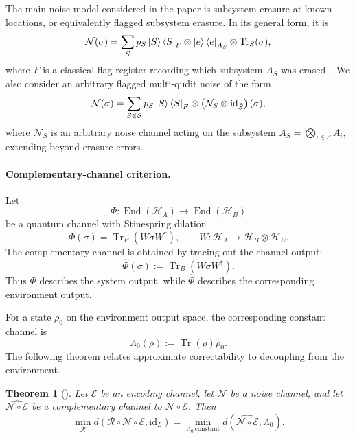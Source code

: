 \documentclass[10pt,twocolumn,superscriptaddress,aps,amsmath,amssymb,citeautoscript,floatfix,prx]{revtex4-2}
\newtheorem{theorem}{Theorem}
\theoremstyle{plain}
\theoremstyle{plain}
\theoremstyle{plain}
\theoremstyle{plain}
\theoremstyle{plain}
\theoremstyle{plain}
\theoremstyle{plain}
\theoremstyle{definition}
\theoremstyle{plain}
\begin{document}
The main noise model considered in the paper is subsystem erasure at known locations, or equivalently flagged subsystem erasure. In its general form, it is
\begin{equation}\label{eq:erasure_noise}
\mathcal N(\sigma)
=
\sum_S
p_S
\ket S\bra S_F
\otimes
\ket e\bra e_{A_S}
\otimes
\operatorname{Tr}_S(\sigma),
\end{equation}
where $F$ is a classical flag register recording which subsystem $A_S$ was erased~\cite{Faist2020}. 
We also consider an arbitrary flagged multi-qudit noise of the form
\begin{equation}\label{eq:arbitrary_multiqudit_noise}
\mathcal N(\sigma)
=
\sum_{S\in\mathcal S}
p_S
\ket S\bra S_F
\otimes
\left(
\mathcal N_S
\otimes
\mathrm{id}_{\hat S}
\right)(\sigma),
\end{equation}
where $\mathcal N_S$ is an arbitrary noise channel acting on the subsystem $A_S=\bigotimes_{i\in S}A_i$, extending beyond erasure errors.

\paragraph{Complementary-channel criterion.}

Let
$$
\Phi:\operatorname{End}(\mathcal H_A)\to\operatorname{End}(\mathcal H_B)
$$
be a quantum channel with Stinespring dilation
$$
\Phi(\sigma)
=
\operatorname{Tr}_E(W\sigma W^\dagger),
\qquad
W:\mathcal H_A\to\mathcal H_B\otimes\mathcal H_E .
$$
The complementary channel is obtained by tracing out the channel output:
$$
\widehat\Phi(\sigma)
:=
\operatorname{Tr}_B(W\sigma W^\dagger).
$$
Thus $\Phi$ describes the system output, while $\widehat\Phi$ describes the corresponding environment output.

For a state $\rho_0$ on the environment output space, the corresponding constant channel is
\begin{equation}\label{eq:constant_channel_def}
\Lambda_0(\rho)
:=
\operatorname{Tr}(\rho)\rho_0 .
\end{equation}
The following theorem relates approximate correctability to decoupling from the environment.

\begin{theorem}[\citet{Beny2010}]\label{thm:beny}
Let $\mathcal E$ be an encoding channel, let $\mathcal N$ be a noise channel, and let $\widehat{\mathcal N\circ\mathcal E}$ be a complementary channel to $\mathcal N\circ\mathcal E$. Then
\begin{equation}\label{eq:beny}
    \min_{\mathcal R}
    d\left(
        \mathcal R\circ\mathcal N\circ\mathcal E,
        \mathrm{id}_L
    \right)
    =
    \min_{\Lambda_0\,\mathrm{constant}}
    d\left(
        \widehat{\mathcal N\circ\mathcal E},
        \Lambda_0
    \right).
\end{equation}
\end{theorem}
\end{document}
